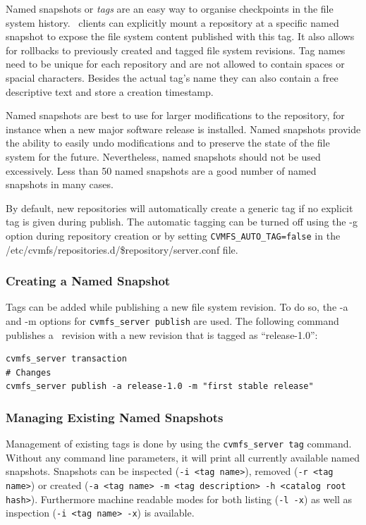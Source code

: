 Named snapshots or \emph{tags} are an easy way to organise checkpoints in the file system history.
\cvmfs\ clients can explicitly mount a repository at a specific named snapshot to expose the file system content published with this tag.
It also allows for rollbacks to previously created and tagged file system revisions.
Tag names need to be unique for each repository and are not allowed to contain spaces or spacial characters.
Besides the actual tag's name they can also contain a free descriptive text and store a creation timestamp.

Named snapshots are best to use for larger modifications to the repository, for instance when a new major software release is installed.
Named snapshots provide the ability to easily undo modifications and to preserve the state of the file system for the future.
Nevertheless, named snapshots should not be used excessively.
Less than 50 named snapshots are a good number of named snapshots in many cases.

By default, new repositories will automatically create a generic tag if no explicit tag is given during publish.
The automatic tagging can be turned off using the -g option during repository creation or by setting \texttt{CVMFS\_AUTO\_TAG=false} in the /etc/cvmfs/repositories.d/\$repository/server.conf file.

\subsubsection{Creating a Named Snapshot}
Tags can be added while publishing a new file system revision.
To do so, the -a and -m options for \texttt{cvmfs\_server publish} are used.
The following command publishes a \cvmfs\ revision with a new revision that is tagged as ``release-1.0'':
\begin{verbatim}
cvmfs_server transaction
# Changes
cvmfs_server publish -a release-1.0 -m "first stable release"
\end{verbatim}

\subsubsection{Managing Existing Named Snapshots}
Management of existing tags is done by using the \texttt{cvmfs\_server tag} command.
Without any command line parameters, it will print all currently available named snapshots.
Snapshots can be inspected (\texttt{-i <tag name>}), removed (\texttt{-r <tag name>}) or created (\texttt{-a <tag name> -m <tag description> -h <catalog root hash>}).
Furthermore machine readable modes for both listing (\texttt{-l -x}) as well as inspection (\texttt{-i <tag name> -x}) is available.

